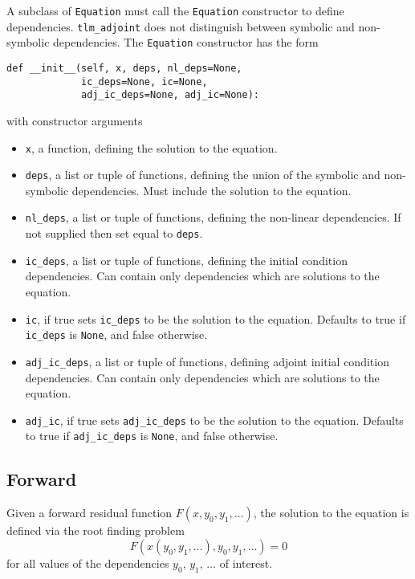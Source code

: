 \documentclass[11pt]{article}
\begin{document}
A subclass of \texttt{Equation} must call the \texttt{Equation} constructor to
define dependencies. \texttt{tlm\_adjoint} does not distinguish between
symbolic and non-symbolic dependencies. The \texttt{Equation} constructor has
the form
\begin{lstlisting}
def __init__(self, x, deps, nl_deps=None,
             ic_deps=None, ic=None,
             adj_ic_deps=None, adj_ic=None):
\end{lstlisting}
with constructor arguments
\begin{itemize}
  \item \texttt{x}, a function, defining the solution to the equation.
  \item \texttt{deps}, a list or tuple of functions, defining the union of the
    symbolic and non-symbolic dependencies. Must include the solution to the
    equation.
  \item \texttt{nl\_deps}, a list or tuple of functions, defining the
    non-linear dependencies. If not supplied then set equal to \texttt{deps}.
  \item \texttt{ic\_deps}, a list or tuple of functions, defining the initial
    condition dependencies. Can contain only dependencies which are solutions
    to the equation.
  \item \texttt{ic}, if true sets \texttt{ic\_deps} to be the solution to the
    equation. Defaults to true if \texttt{ic\_deps} is \texttt{None}, and false
    otherwise.
  \item \texttt{adj\_ic\_deps}, a list or tuple of functions, defining adjoint
    initial condition dependencies. Can contain only dependencies which are
    solutions to the equation.
  \item \texttt{adj\_ic}, if true sets \texttt{adj\_ic\_deps} to be the
    solution to the equation. Defaults to true if \texttt{adj\_ic\_deps} is
    \texttt{None}, and false otherwise.
\end{itemize}

\subsection{Forward}

Given a forward residual function $F \left( x, y_0, y_1, \ldots \right)$, the
solution to the equation is defined via the root finding problem
\begin{equation*}
  F \left( \hat{x} \left( y_0, y_1, \ldots \right), y_0, y_1, \ldots \right)
    = 0
\end{equation*}
for all values of the dependencies $y_0$, $y_1$, $\ldots$ of interest.
\end{document}
